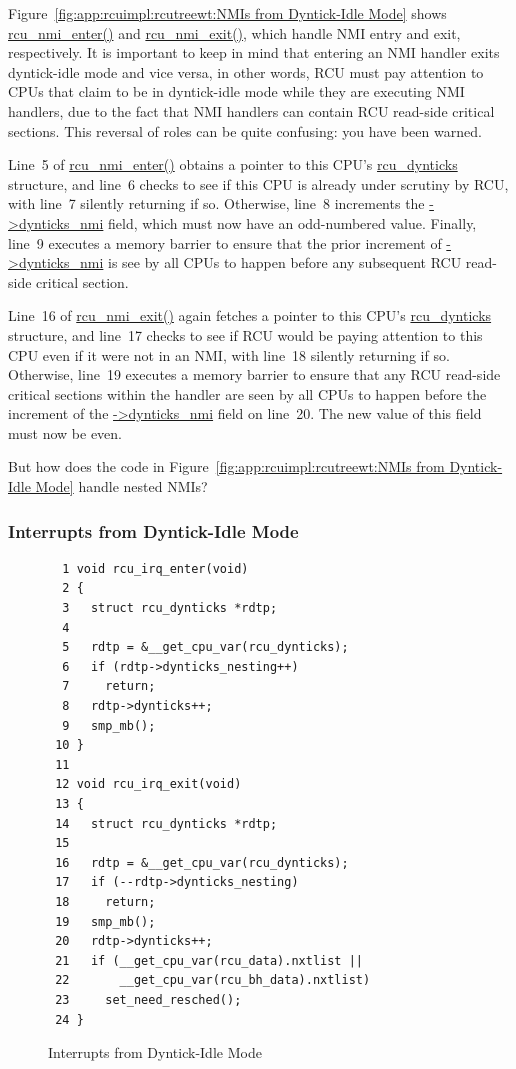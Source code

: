 Figure~\ref{fig:app:rcuimpl:rcutreewt:NMIs from Dyntick-Idle Mode}
shows \url{rcu_nmi_enter()} and \url{rcu_nmi_exit()}, which handle
NMI entry and exit, respectively.
It is important to keep in mind that entering an NMI handler
exits dyntick-idle mode and vice versa, in other words, RCU must
pay attention to CPUs that claim to be in dyntick-idle mode while
they are executing NMI handlers, due to the fact that NMI handlers
can contain RCU read-side critical sections.
This reversal of roles can be quite confusing: you have been warned.

Line~5 of \url{rcu_nmi_enter()} obtains a pointer to this CPU's
\url{rcu_dynticks} structure, and line~6 checks to see if this
CPU is already under scrutiny by RCU, with line~7 silently returning
if so.
Otherwise, line~8 increments the \url{->dynticks_nmi} field, which
must now have an odd-numbered value.
Finally, line~9 executes a memory barrier to ensure that the prior
increment of \url{->dynticks_nmi} is see by all CPUs to happen
before any subsequent RCU read-side critical section.

Line~16 of \url{rcu_nmi_exit()} again fetches a pointer to this CPU's
\url{rcu_dynticks} structure, and line~17 checks to see if RCU would
be paying attention to this CPU even if it were not in an NMI,
with line~18 silently returning if so.
Otherwise, line~19 executes a memory barrier to ensure that any
RCU read-side critical sections within the handler are seen by all
CPUs to happen before the increment of the \url{->dynticks_nmi} field
on line~20.
The new value of this field must now be even.

\QuickQuiz{}
	But how does the code in
	Figure~\ref{fig:app:rcuimpl:rcutreewt:NMIs from Dyntick-Idle Mode}
	handle nested NMIs?
 \QuickQuizEnd

\subsubsection{Interrupts from Dyntick-Idle Mode}
\label{app:rcuimpl:rcutreewt:Interrupts from Dyntick-Idle Mode}

\begin{figure}[tbp]
{ \scriptsize
\begin{verbatim}
  1 void rcu_irq_enter(void)
  2 {
  3   struct rcu_dynticks *rdtp;
  4
  5   rdtp = &__get_cpu_var(rcu_dynticks);
  6   if (rdtp->dynticks_nesting++)
  7     return;
  8   rdtp->dynticks++;
  9   smp_mb();
 10 }
 11
 12 void rcu_irq_exit(void)
 13 {
 14   struct rcu_dynticks *rdtp;
 15
 16   rdtp = &__get_cpu_var(rcu_dynticks);
 17   if (--rdtp->dynticks_nesting)
 18     return;
 19   smp_mb();
 20   rdtp->dynticks++;
 21   if (__get_cpu_var(rcu_data).nxtlist ||
 22       __get_cpu_var(rcu_bh_data).nxtlist)
 23     set_need_resched();
 24 }
\end{verbatim}
}
\caption{Interrupts from Dyntick-Idle Mode}
\label{fig:app:rcuimpl:rcutreewt:Interrupts from Dyntick-Idle Mode}
\end{figure}

